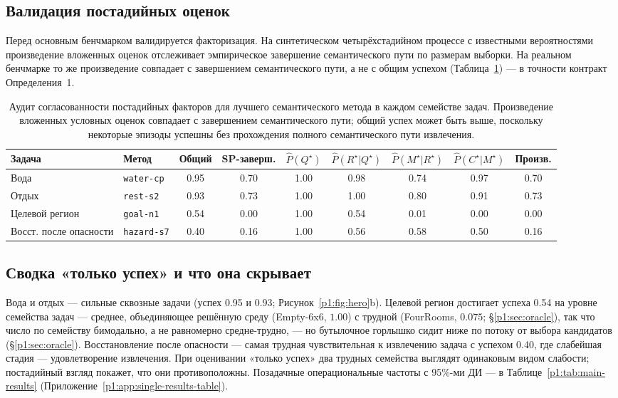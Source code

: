 \documentclass{article}
\begin{document}
\subsection{Валидация постадийных оценок}
\label{p1:sec:validation}

Перед основным бенчмарком валидируется факторизация. На
синтетическом четырёхстадийном процессе с известными вероятностями
произведение вложенных оценок отслеживает эмпирическое завершение семантического пути
по размерам выборки. На реальном бенчмарке то же произведение совпадает с
завершением семантического пути, а не с общим успехом
(Таблица~\ref{p1:tab:consistency}) --- в точности контракт
Определения~1.

\begin{table}[t]
  \caption{Аудит согласованности постадийных факторов для лучшего семантического метода в каждом семействе задач. Произведение вложенных условных оценок совпадает с завершением семантического пути; общий успех может быть выше, поскольку некоторые эпизоды успешны без прохождения полного семантического пути извлечения.}
  \label{p1:tab:consistency}
  \centering
  \small
  \begin{tabular}{p{1.7cm}p{2.5cm}c c c c c c c}
    \toprule
    Задача & Метод & Общий & SP-заверш. & $\hat P(Q^\star)$ & $\hat P(R^\star|Q^\star)$ & $\hat P(M^\star|R^\star)$ & $\hat P(C^\star|M^\star)$ & Произв. \\
    \midrule
    Вода & \texttt{water-cp} & 0.95 & 0.70 & 1.00 & 0.98 & 0.74 & 0.97 & 0.70 \\
    Отдых & \texttt{rest-s2} & 0.93 & 0.73 & 1.00 & 1.00 & 0.80 & 0.91 & 0.73 \\
    Целевой регион & \texttt{goal-n1} & 0.54 & 0.00 & 1.00 & 0.54 & 0.01 & 0.00 & 0.00 \\
    Восст. после опасности & \texttt{hazard-s7} & 0.40 & 0.16 & 1.00 & 0.56 & 0.58 & 0.50 & 0.16 \\
    \bottomrule
  \end{tabular}
\end{table}

\subsection{Сводка «только успех» и что она скрывает}
\label{p1:sec:single-results}

Вода и отдых --- сильные сквозные задачи (успех 0.95 и 0.93; Рисунок~\ref{p1:fig:hero}b). Целевой регион достигает успеха 0.54 на уровне семейства задач --- среднее, объединяющее решённую среду (Empty-6x6, $1.00$) с трудной (FourRooms, $0.075$; \S\ref{p1:sec:oracle}), так что число по семейству бимодально, а не равномерно средне-трудно, --- но бутылочное горлышко сидит ниже по потоку от выбора кандидатов (\S\ref{p1:sec:oracle}). Восстановление после опасности --- самая трудная чувствительная к извлечению задача с успехом 0.40, где слабейшая стадия --- удовлетворение извлечения. При оценивании «только успех» два трудных семейства выглядят одинаковым видом слабости; постадийный взгляд покажет, что они противоположны. Позадачные операциональные частоты с 95\%-ми ДИ --- в Таблице~\ref{p1:tab:main-results} (Приложение~\ref{p1:app:single-results-table}).
\end{document}
